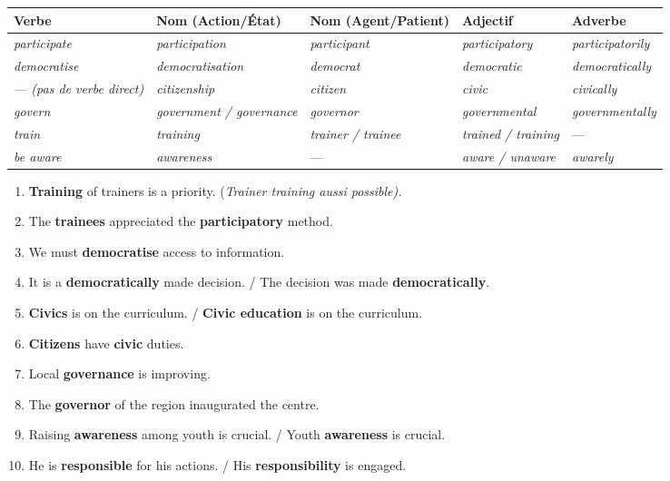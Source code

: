 \documentclass[11pt]{article}
\newcommand{\eng}[1]{\ifmmode\text{\textit{#1}}\else\begingroup\selectlanguage{english}\itshape #1\endgroup\fi}
\begin{document}
\begin{corrige}
\begin{center}
\begin{tabular}{|l|l|l|l|l|}
\hline
\rowcolor{popblueL} \textbf{Verbe} & \textbf{Nom (Action/État)} & \textbf{Nom (Agent/Patient)} & \textbf{Adjectif} & \textbf{Adverbe} \\
\hline
\eng{participate} & \eng{participation} & \eng{participant} & \eng{participatory} & \eng{participatorily} \\
\hline
\eng{democratise} & \eng{democratisation} & \eng{democrat} & \eng{democratic} & \eng{democratically} \\
\hline
\eng{— (pas de verbe direct)} & \eng{citizenship} & \eng{citizen} & \eng{civic} & \eng{civically} \\
\hline
\eng{govern} & \eng{government / governance} & \eng{governor} & \eng{governmental} & \eng{governmentally} \\
\hline
\eng{train} & \eng{training} & \eng{trainer / trainee} & \eng{trained / training} & — \\
\hline
\eng{be aware} & \eng{awareness} & — & \eng{aware / unaware} & \eng{awarely} \\
\hline
\end{tabular}
\end{center}
\end{corrige}

\begin{corrige}
\begin{enumerate}
    \item \textbf{Training} of trainers is a priority. (\eng{Trainer training} aussi possible).
    \item The \textbf{trainees} appreciated the \textbf{participatory} method.
    \item We must \textbf{democratise} access to information.
    \item It is a \textbf{democratically} made decision. / The decision was made \textbf{democratically}.
    \item \textbf{Civics} is on the curriculum. / \textbf{Civic education} is on the curriculum.
    \item \textbf{Citizens} have \textbf{civic} duties.
    \item Local \textbf{governance} is improving.
    \item The \textbf{governor} of the region inaugurated the centre.
    \item Raising \textbf{awareness} among youth is crucial. / Youth \textbf{awareness} is crucial.
    \item He is \textbf{responsible} for his actions. / His \textbf{responsibility} is engaged.
\end{enumerate}
\end{corrige}
\end{document}
